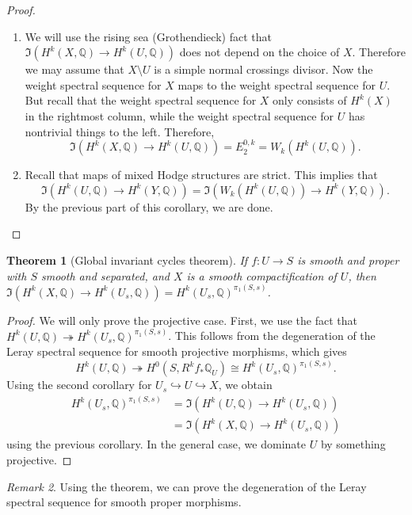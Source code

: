 \documentclass[leqno, openany]{memoir}
\newtheorem{thm}{Theorem}[section]
\theoremstyle{definition}
\theoremstyle{remark}
\newtheorem{rmk}[thm]{Remark}
\theoremstyle{plain}
\theoremstyle{definition}
\theoremstyle{remark}
\newcommand{\Q}{\mathbb{Q}}
\begin{document}
\begin{proof}\leavevmode
    \begin{enumerate}
        \item We will use the rising sea (Grothendieck) fact that $\Im(H^k(X, \Q) \to H^k(U, \Q))$ does not depend on the choice of $X$. Therefore we may assume that $X \setminus U$ is a simple normal crossings divisor. Now the weight spectral sequence for $X$ maps to the weight spectral sequence for $U$. But recall that the weight spectral sequence for $X$ only consists of $H^k(X)$ in the rightmost column, while the weight spectral sequence for $U$ has nontrivial things to the left. Therefore, 
            \[ \Im(H^k(X, \Q) \to H^k(U, \Q)) = E_2^{0,k} = W_k(H^k(U, \Q)). \]
        \item Recall that maps of mixed Hodge structures are strict. This implies that
            \[ \Im(H^k(U, \Q) \to H^k(Y, \Q)) = \Im(W_k(H^k(U, \Q)) \to H^k(Y, \Q)). \]
            By the previous part of this corollary, we are done. \qedhere
    \end{enumerate}
\end{proof}

\begin{thm}[Global invariant cycles theorem]
    If $f \colon U \to S$ is smooth and proper with $S$ smooth and separated, and $X$ is a smooth compactification of $U$, then $\Im(H^k(X, \Q) \to H^k(U_s, \Q)) = H^k(U_s, \Q)^{\pi_1(S, s)}$.
\end{thm}

\begin{proof}
    We will only prove the projective case. First, we use the fact that $H^k(U, \Q) \twoheadrightarrow H^k(U_s, \Q)^{\pi_1(S, s)}$. This follows from the degeneration of the Leray spectral sequence for smooth projective morphisms, which gives
    \[ H^k(U, \Q) \twoheadrightarrow H^0(S, R^k f_* \Q_U) \cong H^k(U_s, \Q)^{\pi_1(S, s)}. \]
    Using the second corollary for $U_s \hookrightarrow U \hookrightarrow X$, we obtain
    \begin{align*}
        H^k(U_s, \Q)^{\pi_1(S, s)} &= \Im(H^k(U, \Q) \to H^k(U_s, \Q)) \\
        &= \Im(H^k(X, \Q) \to H^k(U_s, \Q))
    \end{align*}
    using the previous corollary. In the general case, we dominate $U$ by something projective.
\end{proof}

\begin{rmk}
    Using the theorem, we can prove the degeneration of the Leray spectral sequence for smooth proper morphisms.
\end{rmk}
\end{document}
